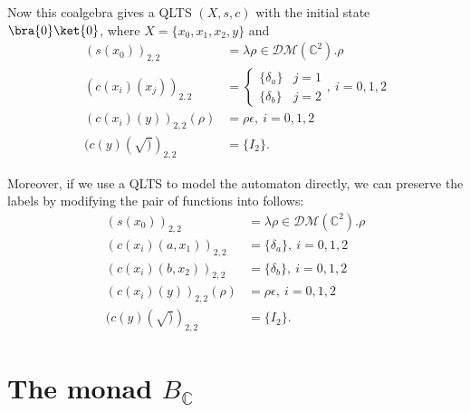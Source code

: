 \documentclass{llncs}
\newcommand{\C}{\mathbb{C}}
\newcommand{\BC}{B_{\mathbb{C}}}
\begin{document}
\begin{example}[\cite{F12}]
Now this coalgebra gives a QLTS $(X,s,c)$ with the initial state $\bra{0}\ket{0}$, where $X=\{x_0,x_1,x_2,y\}$ and 
$$
\begin{aligned}
(s(x_0))_{2,2}&=\lambda \rho\in \mathcal{DM}(\C^{2}). \rho\\
(c(x_i)(x_j))_{2,2}&=\begin{cases}
\{\delta_a\} &j=1\\
\{\delta_b\} &j=2
\end{cases},\ i=0,1,2\\
(c(x_i)(y))_{2,2}(\rho)&=\rho \epsilon,\ i=0,1,2\\
(c(y)(\surd))_{2,2}&=\{I_2\}.
\end{aligned}
$$


\end{example}

Moreover, if we use a QLTS to model the automaton directly, we can preserve the labels by modifying the pair of functions into follows:
$$
\begin{aligned}
(s(x_0))_{2,2}&=\lambda \rho\in \mathcal{DM}(\C^{2}). \rho\\
(c(x_i)(a,x_1))_{2,2}&=\{\delta_a\},\ i=0,1,2\\
(c(x_i)(b,x_2))_{2,2}&=\{\delta_b\},\ i=0,1,2\\
(c(x_i)(y))_{2,2}(\rho)&=\rho \epsilon,\ i=0,1,2\\
(c(y)(\surd))_{2,2}&=\{I_2\}.
\end{aligned}
$$

\begin{comment}
\begin{theorem}
QLISs in \cite{H14} are more expressive than the coalgebraic models in \cite{F12}.
\end{theorem}

\begin{proof}
To be proved.
\end{proof}
\end{comment}

\section{The monad $\BC$}

\end{document}
